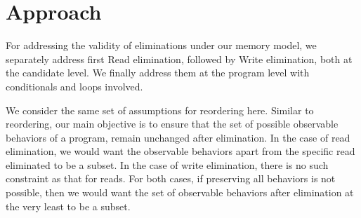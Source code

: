 \section{Approach}

    For addressing the validity of eliminations under our memory model, we separately address first Read elimination, followed by Write elimination, both at the candidate level. 
    We finally address them at the program level with conditionals and loops involved. 

    We consider the same set of assumptions for reordering here. 
    Similar to reordering, our main objective is to ensure that the set of possible observable behaviors of a program, remain unchanged after elimination. 
    In the case of read elimination, we would want the observable behaviors apart from the specific read eliminated to be a subset.
    In the case of write elimination, there is no such constraint as that for reads.
    For both cases, if preserving all behaviors is not possible, then we would want the set of observable behaviors after elimination at the very least to be a subset.
